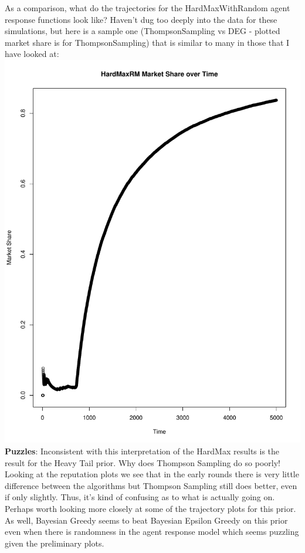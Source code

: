\documentclass[11pt,letterpaper]{article}
\begin{document}
As a comparison, what do the trajectories for the HardMaxWithRandom agent response functions look like? Haven't dug too deeply into the data for these simulations, but here is a sample one (ThompsonSampling vs DEG - plotted market share is for ThompsonSampling) that is similar to many in those that I have looked at: \\
\includegraphics[scale=0.25]{hmr_over_time} \\
\textbf{Puzzles}: Inconsistent with this interpretation of the HardMax results is the result for the Heavy Tail prior. Why does Thompson Sampling do so poorly! Looking at the reputation plots we see that in the early rounds there is very little difference between the algorithms but Thompson Sampling still does better, even if only slightly. Thus, it's kind of confusing as to what is actually going on. Perhaps worth looking more closely at some of the trajectory plots for this prior. As well, Bayesian Greedy seems to beat Bayesian Epsilon Greedy on this prior even when there is randomness in the agent response model which seems puzzling given the preliminary plots. \\
\end{document}
